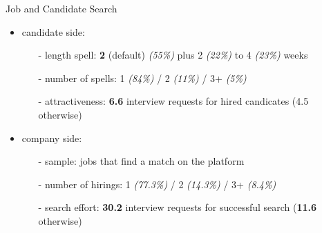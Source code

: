 \begin{frame}{Job and Candidate Search}
    \begin{itemize}
        \item<+-> candidate side:
        \begin{itemize}
            \item[-] length spell: \textcolor{frenchlilac!45!white}{\textbf{2}} (default) {\scriptsize \textit{(55\%)}} plus 2  {\scriptsize \textit{(22\%)}} to 4  {\scriptsize \textit{(23\%)}} weeks
            \item[-] number of spells: 1 {\scriptsize \textit{(84\%)}} / 2 {\scriptsize \textit{(11\%)}} / 3+ {\scriptsize \textit{(5\%)}}
            \item[-] attractiveness: \textcolor{frenchlilac!45!white}{\textbf{6.6}} interview requests for hired candicates (4.5 otherwise)
        \end{itemize}
        \item<+-> company side:
        \begin{itemize}
            \item[-] sample: jobs that find a match on the platform
            \item[-] number of hirings: 1 {\scriptsize \textit{(77.3\%)}} / 2 {\scriptsize \textit{(14.3\%)}} / 3+ {\scriptsize \textit{(8.4\%)}}
            \item[-] search effort: \textcolor{frenchlilac!45!white}{\textbf{30.2}} interview requests for successful search (\textcolor{frenchlilac!45!white}{\textbf{11.6}} otherwise) 
        \end{itemize}
    \end{itemize}
\end{frame}

